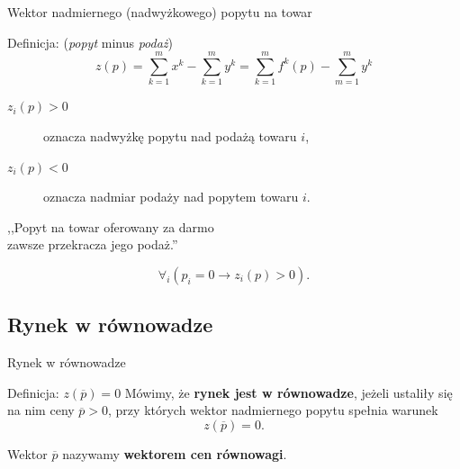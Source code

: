 \documentclass[a4paper, 11pt]{beamer}
\begin{document}
      \begin{frame}{Wektor nadmiernego (nadwyżkowego) popytu na towar}
	\begin{block}{Definicja: (\textit{popyt} minus \textit{podaż})}
	  $$z(p) = \sum_{k=1}^m x^k - \sum_{k=1}^m y^k = \sum_{k=1}^m f^k (p) -
	  \sum_{m=1}^m y^k$$
	\end{block}

	\begin{description}
	  
	  \item[$z_i (p) > 0$] oznacza nadwyżkę popytu nad podażą towaru $i$,

	  \item[$z_i (p) < 0$] oznacza nadmiar podaży nad popytem towaru $i$.

	\end{description}
	
	\begin{center}
	\alert{,,Popyt na towar oferowany za darmo\\ zawsze przekracza
	jego podaż.''}
	\end{center}
	\[ \forall_i (p_i=0 \rightarrow z_i (p) > 0). \]

      \end{frame}

    \subsection{Rynek w równowadze}

      \begin{frame}{Rynek w równowadze}
	\begin{block}{Definicja: $z(\overline{p}) = 0$}
	  Mówimy, że \textbf{rynek jest w równowadze}, jeżeli ustaliły się na
	  nim ceny $\overline{p} > 0$, przy których wektor nadmiernego popytu
	  spełnia warunek
	  \[ z(\overline{p}) = 0. \]
	\end{block}

	Wektor $\overline{p}$ nazywamy \textbf{wektorem cen równowagi}.
    \end{frame}
\end{document}
